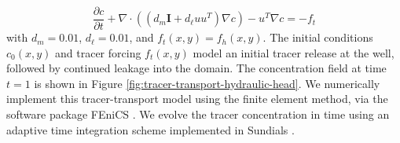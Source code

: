 \begin{equation}
    \frac{\partial c}{\partial t} + \nabla \cdot ((d_m \mathbf{I} + d_{\ell} u u^T) \nabla c) - u^T \nabla c = -f_t
    \label{eq:tracer-concentration}
\end{equation}
with $d_m=0.01$, $d_{\ell}=0.01$, and $f_t(x,y) = f_h(x,y)$. The initial conditions $c_0(x,y)$ and tracer forcing $f_t(x,y)$ model an initial tracer release at the well, followed by continued leakage into the domain. The concentration field at time $t = 1$ is shown in Figure \ref{fig:tracer-transport-hydraulic-head}. We numerically implement this tracer-transport model using the finite element method, via the software package FEniCS \citep{FENICS}. We evolve the tracer concentration in time using an adaptive time integration scheme implemented in Sundials \citep{sundials}. 

